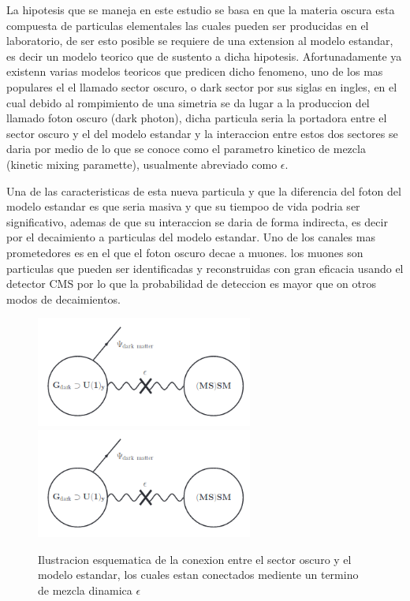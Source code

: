 La hipotesis que se maneja en este estudio se basa en que la materia oscura esta compuesta de particulas elementales las cuales pueden ser producidas en el laboratorio, de ser esto posible se requiere de una extension al modelo estandar, es decir un modelo teorico que de sustento a dicha hipotesis. Afortunadamente ya existenn varias modelos teoricos que predicen dicho fenomeno, uno de los mas populares el el llamado sector oscuro, o dark sector por sus siglas en ingles, en el cual debido al rompimiento de una simetria se da lugar a la produccion del llamado foton oscuro (dark photon), dicha particula seria la portadora entre el sector oscuro y el del modelo estandar y la interaccion entre estos dos sectores se daria por medio de lo que se conoce como el parametro kinetico de mezcla (kinetic mixing paramette), usualmente abreviado como $\epsilon$. 

Una de las caracteristicas de esta nueva particula y que la diferencia del foton del modelo estandar es que seria masiva y que su tiempoo de vida podria ser significativo, ademas de que su interaccion se daria de forma indirecta, es decir por el decaimiento a particulas del modelo estandar.  Uno de los canales mas prometedores es en el que el foton oscuro decae a muones. los muones son particulas que pueden ser identificadas y reconstruidas con gran eficacia usando el detector CMS por lo que la probabilidad de deteccion es mayor que on otros modos de decaimientos.

\begin{figure}
\begin{center}
  \includegraphics[width=2.8in]{sketch_darksector.png}
  \includegraphics[width=2.8in]{sketch_darksector.png}
  \caption{Ilustracion esquematica de la conexion entre el sector oscuro y el modelo estandar, los cuales estan conectados mediente un termino de mezcla dinamica $\epsilon$}
  \label{fig:AMS_positron}
\end{center}
\end{figure}


